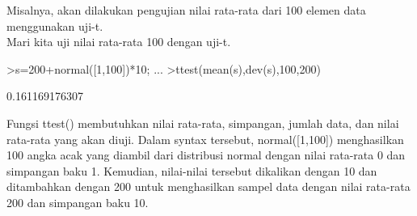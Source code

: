 \documentclass[a4paper,10pt]{article}
\begin{document}
\begin{eulernotebook}
\begin{eulercomment}
\begin{eulercomment}
\begin{eulercomment}
\begin{eulercomment}
\begin{eulercomment}
\begin{eulercomment}
\begin{eulercomment}
\begin{eulercomment}
\begin{eulercomment}
\begin{eulercomment}
\begin{eulercomment}
\begin{eulercomment}
\begin{eulercomment}
\begin{eulercomment}
\begin{eulercomment}
\begin{eulercomment}
\begin{eulercomment}
\begin{eulercomment}
\begin{eulercomment}
\begin{eulercomment}
\begin{eulercomment}
Misalnya, akan dilakukan pengujian nilai rata-rata dari 100 elemen
data menggunakan uji-t.\\
Mari kita uji nilai rata-rata 100 dengan uji-t.
\end{eulercomment}
\begin{eulerprompt}
>s=200+normal([1,100])*10; ...
>ttest(mean(s),dev(s),100,200)
\end{eulerprompt}
\begin{euleroutput}
  0.161169176307
\end{euleroutput}
\begin{eulercomment}
Fungsi ttest() membutuhkan nilai rata-rata, simpangan, jumlah data,
dan nilai rata-rata yang akan diuji. Dalam syntax tersebut,
normal([1,100]) menghasilkan 100 angka acak yang diambil dari
distribusi normal dengan nilai rata-rata 0 dan simpangan baku 1.
Kemudian, nilai-nilai tersebut dikalikan dengan 10 dan ditambahkan
dengan 200 untuk menghasilkan sampel data dengan nilai rata-rata 200
dan simpangan baku 10.


\end{eulercomment}
\end{eulercomment}
\end{eulercomment}
\end{eulercomment}
\end{eulercomment}
\end{eulercomment}
\end{eulercomment}
\end{eulercomment}
\end{eulercomment}
\end{eulercomment}
\end{eulercomment}
\end{eulercomment}
\end{eulercomment}
\end{eulercomment}
\end{eulercomment}
\end{eulercomment}
\end{eulercomment}
\end{eulercomment}
\end{eulercomment}
\end{eulercomment}
\end{eulercomment}
\end{eulernotebook}
\end{document}
